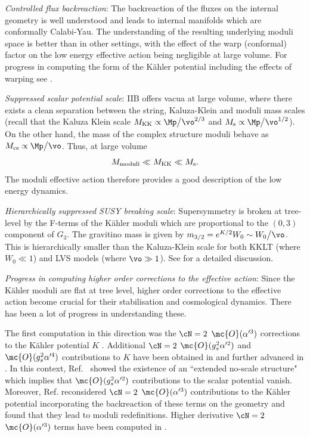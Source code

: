 \item \emph{Controlled flux backreaction}:  The  backreaction of the fluxes on the internal geometry is well understood and leads to internal
manifolds which are conformally Calabi-Yau. The understanding of the resulting underlying moduli space is better than in other settings, with the effect of the warp (conformal) factor on the low energy effective action being negligible at large volume. For progress in computing the  form of the K\"ahler potential including the effects of warping see \cite{DeWolfe:2002nn, deAlwis:2003sn, Giddings:2005ff, Frey:2006wv, Burgess:2006mn, Douglas:2007tu, Shiu:2008ry, Douglas:2008jx,Frey:2008xw, Martucci:2014ska}. 


\item \emph{Suppressed scalar potential scale}: IIB offers vacua at large volume, where there exists a clean separation between the string, Kaluza-Klein and moduli mass scales (recall that the Kaluza Klein scale $M_{\rm KK} \propto  \Mp \big{/} \vo^{2/3}$ and  $M_{\rm s} \propto  \Mp \big{/} \vo^{1/2}$). On the other hand, the mass of the complex structure moduli behave as $M_{\rm cs} \propto  \Mp \big{/} \vo$. Thus, at large volume
$$
M_{\rm moduli} \ll M_{\rm KK} \ll M_{\rm s}.
$$
The moduli effective action therefore provides a good description of the low energy dynamics.

\item \emph{Hierarchically suppressed SUSY breaking scale}: Supersymmetry is broken at tree-level by the F-terms of the K\"ahler moduli which are proportional
to the $(0,3)$ component of $G_3$. The gravitino mass is given by  $m_{3/2}= e^{K/2} W_0 \sim {W_0} \big{/} {\vo}$. This is
hierarchically smaller than the Kaluza-Klein scale for both KKLT (where $W_0\ll 1$) and  LVS models (where $\vo \gg 1$). See  \cite{Cicoli:2013swa}  for a detailed discussion.
  
\item \emph{Progress in computing higher order corrections to the effective action}: Since the K\"ahler moduli are flat at tree level, 
 higher order corrections to the effective action become crucial for their stabilisation and cosmological dynamics. There has been a lot of progress in understanding these.
 
 The first computation in this direction was the $\cN=2$ $\mc{O}(\alpha'^3)$ corrections to the K\"ahler potential $K$ \cite{Becker:2002nn}. Additional $\cN=2$ $\mc{O}(g_s^2 \alpha'^2)$ and $\mc{O}(g_s^2 \alpha'^4)$ contributions to $K$ have been obtained  in \cite{Berg:2005ja} and further advanced  in \cite{Berg:2007wt}. In this context, Ref.~\cite{Cicoli:2007xp} showed the existence of an ``extended no-scale structure" which implies that $\mc{O}(g_s^2 \alpha'^2)$ contributions to the scalar potential vanish. Moreover, Ref. \cite{Bonetti:2016dqh} reconsidered $\cN=2$ $\mc{O}(\alpha'^3)$ contributions to the K\"ahler potential incorporating the backreaction of these terms on the  geometry and found that they lead to moduli redefinitions.  Higher derivative $\cN=2$ $\mc{O}(\alpha'^3)$ terms have been computed in \cite{Ciupke:2015msa, Grimm:2017okk}. 

